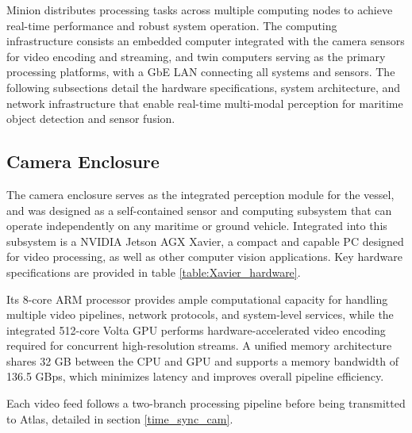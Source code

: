 \documentclass[../main.tex]{subfiles}
\begin{document}

Minion distributes processing tasks across multiple computing nodes to achieve real-time performance and robust system operation.
The computing infrastructure consists an embedded computer integrated with the camera sensors for video encoding and streaming, and twin computers serving as the primary processing platforms, with a \ac{GbE} \ac{LAN} connecting all systems and sensors. 
The following subsections detail the hardware specifications, system architecture, and network infrastructure that enable real-time multi-modal perception for maritime object detection and sensor fusion.

\subsection{Camera Enclosure} \label{comp:camera_enclosure}


The camera enclosure serves as the integrated perception module for the vessel, and was designed as a self-contained sensor and computing subsystem that can operate independently on any maritime or ground vehicle. 
Integrated into this subsystem is a NVIDIA Jetson AGX Xavier, a compact and capable PC designed for video processing, as well as other computer vision applications.
Key hardware specifications are provided in table \ref{table:Xavier_hardware}.

Its 8-core ARM processor provides ample computational capacity for handling multiple video pipelines, network protocols, and system-level services, while the integrated 512-core Volta GPU performs hardware-accelerated video encoding required for concurrent high-resolution streams.  
A unified memory architecture shares 32 GB between the CPU and GPU and supports a memory bandwidth of 136.5 GBps, which minimizes latency and improves overall pipeline efficiency.

Each video feed follows a two-branch processing pipeline before being transmitted to Atlas, detailed in section \ref{time_sync_cam}.
\end{document}
